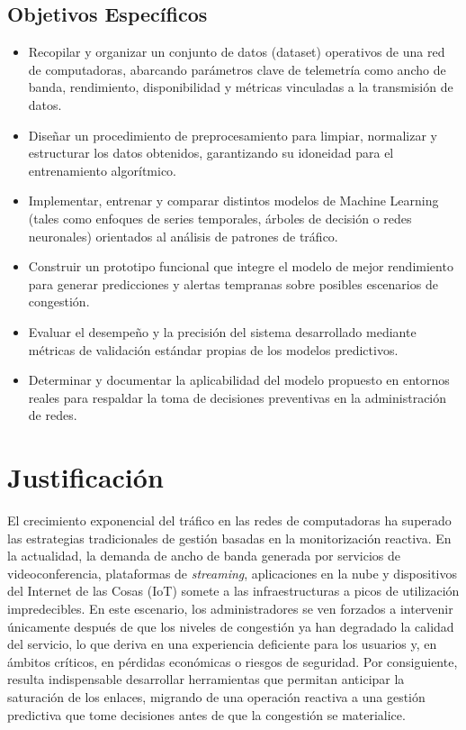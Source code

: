 \documentclass[12pt]{report}
\begin{document}
\subsection{Objetivos Específicos}
\begin{itemize}
\item Recopilar y organizar un conjunto de datos (dataset) operativos de una red de computadoras, abarcando parámetros clave de telemetría como ancho de banda, rendimiento, disponibilidad y métricas vinculadas a la transmisión de datos.
\item Diseñar un procedimiento de preprocesamiento para limpiar, normalizar y estructurar los datos obtenidos, garantizando su idoneidad para el entrenamiento algorítmico.
\item Implementar, entrenar y comparar distintos modelos de Machine Learning (tales como enfoques de series temporales, árboles de decisión o redes neuronales) orientados al análisis de patrones de tráfico.
\item Construir un prototipo funcional que integre el modelo de mejor rendimiento para generar predicciones y alertas tempranas sobre posibles escenarios de congestión.
\item Evaluar el desempeño y la precisión del sistema desarrollado mediante métricas de validación estándar propias de los modelos predictivos.
\item Determinar y documentar la aplicabilidad del modelo propuesto en entornos reales para respaldar la toma de decisiones preventivas en la administración de redes.
\end{itemize}

\section{Justificación}

El crecimiento exponencial del tráfico en las redes de computadoras ha superado las estrategias tradicionales de gestión basadas en la monitorización reactiva. En la actualidad, la demanda de ancho de banda generada por servicios de videoconferencia, plataformas de \textit{streaming}, aplicaciones 
en la nube y dispositivos del Internet de las Cosas (IoT) somete a las infraestructuras a picos de utilización impredecibles. En este escenario, los administradores se ven forzados a intervenir únicamente después de que los niveles de congestión ya han degradado la calidad del servicio, lo que deriva 
en una experiencia deficiente para los usuarios y, en ámbitos críticos, en pérdidas económicas o riesgos de seguridad. Por consiguiente, resulta indispensable desarrollar herramientas que permitan anticipar la saturación de los enlaces, migrando de una operación reactiva a una gestión predictiva que 
tome decisiones antes de que la congestión se materialice.
\end{document}
